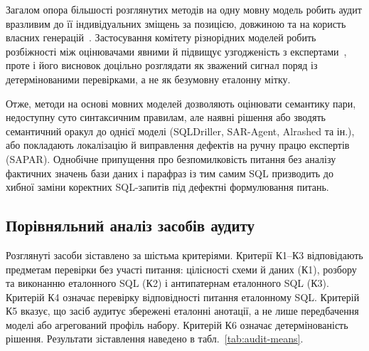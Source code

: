 \documentclass[a4paper,14pt,oneside]{extreport}
\begin{document}
Загалом опора більшості розглянутих методів на одну мовну модель робить аудит вразливим до її індивідуальних зміщень за позицією, довжиною та на користь власних генерацій~\cite{zheng2023judgingllm}. Застосування комітету різнорідних моделей робить розбіжності між оцінювачами явними й підвищує узгодженість з експертами~\cite{chan2024chateval}, проте і його висновок доцільно розглядати як зважений сигнал поряд із детермінованими перевірками, а не як безумовну еталонну мітку.

Отже, методи на основі мовних моделей дозволяють оцінювати семантику пари, недоступну суто синтаксичним правилам, але наявні рішення або зводять семантичний оракул до однієї моделі (SQLDriller, SAR-Agent, Alrashed та ін.), або покладають локалізацію й виправлення дефектів на ручну працю експертів (SAPAR). Однобічне припущення про безпомилковість питання без аналізу фактичних значень бази даних і парафраз із тим самим SQL призводить до хибної заміни коректних SQL-запитів під дефектні формулювання питань.

\subsection{Порівняльний аналіз засобів аудиту}
\label{subsec:audit-comparison}

Розглянуті засоби зіставлено за шістьма критеріями. Критерії К1--К3 відповідають предметам перевірки без участі питання: цілісності схеми й даних (К1), розбору та виконанню еталонного SQL (К2) і антипатернам еталонного SQL (К3). Критерій К4 означає перевірку відповідності питання еталонному SQL. Критерій К5 вказує, що засіб аудитує збережені еталонні анотації, а не лише передбачення моделі або агрегований профіль набору. Критерій К6 означає детермінованість рішення. Результати зіставлення наведено в табл.~\ref{tab:audit-means}.
\end{document}

